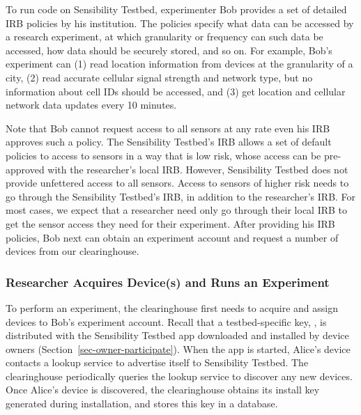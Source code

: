 To run code on Sensibility Testbed, experimenter Bob provides a
set of detailed IRB policies by his institution. The policies specify 
what data can be accessed by a research experiment, at which 
granularity or frequency can such data be accessed, how data 
should be securely stored, and so on.
For example, Bob's experiment can (1) read location information
from devices at the granularity of a city, (2) read accurate
cellular signal strength and network type, but no information
about cell IDs should be accessed, and (3) get location and
cellular network data updates every 10 minutes. 

Note that Bob cannot request access to all sensors at any rate
even his IRB approves such a policy. The Sensibility Testbed's
IRB allows a set of default policies to access to sensors in a
way that is low risk, whose access can be pre-approved with the
researcher's local IRB. However, Sensibility Testbed does not
provide unfettered access to all sensors. Access to sensors of
higher risk needs to go through the Sensibility Testbed's IRB,
in addition to the researcher's IRB. For most cases, we expect
that a researcher need only go through their local IRB to get
the sensor access they need for their experiment. After
providing his IRB policies, Bob next can obtain an experiment
account and request a number of devices from our clearinghouse.

\subsubsection{Researcher Acquires Device(s) and Runs an
Experiment}\label{sec-acquire-run}

To perform an experiment, the clearinghouse first needs to 
acquire and assign devices to Bob's experiment account. 
Recall that a testbed-specific key, , is distributed
with the Sensibility Testbed app downloaded and installed by device
owners (Section~\ref{sec-owner-participate}). When the app is started, 
Alice's device contacts a lookup service to advertise itself to Sensibility 
Testbed. 
The clearinghouse periodically queries the lookup service to
discover any new devices. Once Alice's device is discovered, the
clearinghouse obtains its install key  generated
during installation, and stores this key in a database. 

